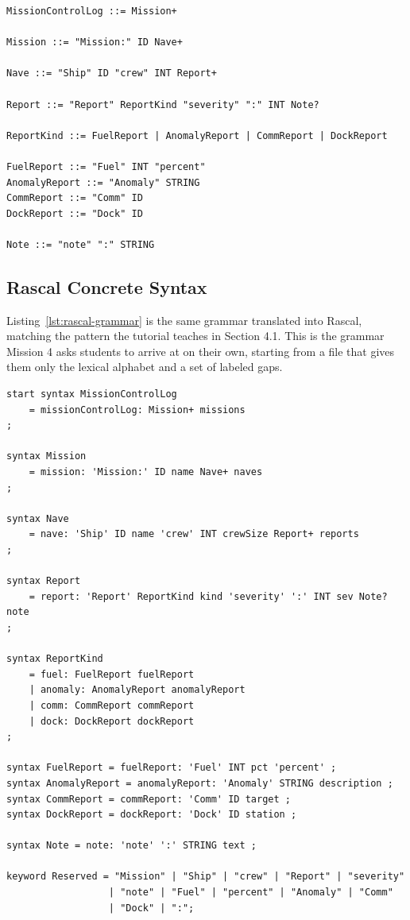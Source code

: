 \documentclass[11pt]{article}
\begin{document}
\begin{lstlisting}[language=EBNF,caption={CosmosLog reference grammar, EBNF form},label={lst:ebnf}]
MissionControlLog ::= Mission+

Mission ::= "Mission:" ID Nave+

Nave ::= "Ship" ID "crew" INT Report+

Report ::= "Report" ReportKind "severity" ":" INT Note?

ReportKind ::= FuelReport | AnomalyReport | CommReport | DockReport

FuelReport ::= "Fuel" INT "percent"
AnomalyReport ::= "Anomaly" STRING
CommReport ::= "Comm" ID
DockReport ::= "Dock" ID

Note ::= "note" ":" STRING
\end{lstlisting}

\subsection{Rascal Concrete Syntax}

Listing~\ref{lst:rascal-grammar} is the same grammar translated into Rascal,
matching the pattern the tutorial teaches in Section 4.1. This is the
grammar Mission 4 asks students to arrive at on their own, starting from a
file that gives them only the lexical alphabet and a set of labeled gaps.

\begin{lstlisting}[language=Rascal,caption={CosmosLog grammar in Rascal concrete syntax},label={lst:rascal-grammar}]
start syntax MissionControlLog
    = missionControlLog: Mission+ missions
;

syntax Mission
    = mission: 'Mission:' ID name Nave+ naves
;

syntax Nave
    = nave: 'Ship' ID name 'crew' INT crewSize Report+ reports
;

syntax Report
    = report: 'Report' ReportKind kind 'severity' ':' INT sev Note? note
;

syntax ReportKind
    = fuel: FuelReport fuelReport
    | anomaly: AnomalyReport anomalyReport
    | comm: CommReport commReport
    | dock: DockReport dockReport
;

syntax FuelReport = fuelReport: 'Fuel' INT pct 'percent' ;
syntax AnomalyReport = anomalyReport: 'Anomaly' STRING description ;
syntax CommReport = commReport: 'Comm' ID target ;
syntax DockReport = dockReport: 'Dock' ID station ;

syntax Note = note: 'note' ':' STRING text ;

keyword Reserved = "Mission" | "Ship" | "crew" | "Report" | "severity"
                  | "note" | "Fuel" | "percent" | "Anomaly" | "Comm"
                  | "Dock" | ":";
\end{lstlisting}
\end{document}
